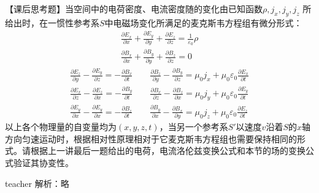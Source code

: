 \begin{example}
【课后思考题】当空间中的电荷密度、电流密度随的变化由已知函数$\rho,j_x,j_y,j_z$
所给出时，在一惯性参考系$S$中电磁场变化所满足的麦克斯韦方程组有微分形式：
\begin{eqnarray*}
\frac{\partial E_x}{\partial x}+\frac{\partial E_y}{\partial y}+\frac{\partial E_z}{\partial z} = \frac{1}{\varepsilon_0}\rho\\ 
\frac{\partial B_x}{\partial x}+\frac{\partial B_y}{\partial y}+\frac{\partial B_z}{\partial z} = 0
\end{eqnarray*}
\begin{eqnarray*}
\frac{\partial E_z}{\partial y}-\frac{\partial E_y}{\partial z} = -\frac{\partial B_x}{\partial t}\qquad  \frac{\partial B_z}{\partial y}-\frac{\partial B_y}{\partial z} = \mu_0 j_x+\mu_0\varepsilon_0\frac{\partial E_x}{\partial t}\\
\frac{\partial E_x}{\partial z}-\frac{\partial E_z}{\partial x} = -\frac{\partial B_y}{\partial t}\qquad  \frac{\partial B_x}{\partial z}-\frac{\partial B_z}{\partial x} = \mu_0 j_y+\mu_0\varepsilon_0\frac{\partial E_y}{\partial t}\\
\frac{\partial E_y}{\partial x}-\frac{\partial E_y}{\partial x} = -\frac{\partial B_z}{\partial t}\qquad \frac{\partial B_y}{\partial x}-\frac{\partial B_x}{\partial y} = \mu_0 j_z+\mu_0\varepsilon_0\frac{\partial E_z}{\partial t}
\end{eqnarray*}
以上各个物理量的自变量均为$(x,y,z,t)$，当另一个参考系$S'$以速度$v$沿着$S$的$x$轴方向匀速运动时，根据相对性原理相对于它麦克斯韦方程组也需要保持相同的形式。请根据上一讲最后一题给出的电荷，电流洛伦兹变换公式和本节的场的变换公式验证其协变性。


\begin{taggedblock}{teacher}
\noindent
解析：略
\end{taggedblock}
\end{example}




